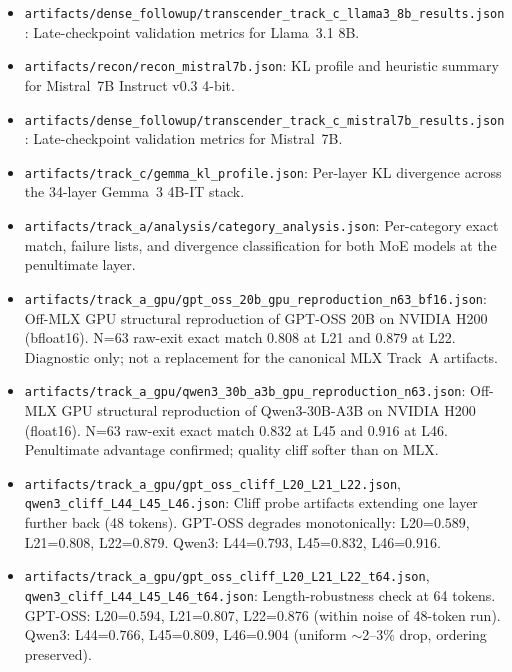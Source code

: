 \documentclass[11pt]{article}
\begin{document}
{\begin{itemize}
\item \texttt{artifacts/dense\_followup/transcender\_track\_c\_llama3\_8b\_results.json}:
  Late-checkpoint validation metrics for Llama~3.1 8B.

\item \texttt{artifacts/recon/recon\_mistral7b.json}:
  KL profile and heuristic summary for Mistral~7B Instruct v0.3 4-bit.

\item \texttt{artifacts/dense\_followup/transcender\_track\_c\_mistral7b\_results.json}:
  Late-checkpoint validation metrics for Mistral~7B.

\item \texttt{artifacts/track\_c/gemma\_kl\_profile.json}:
  Per-layer KL divergence across the 34-layer Gemma~3 4B-IT stack.

\item \texttt{artifacts/track\_a/analysis/category\_analysis.json}:
  Per-category exact match, failure lists, and divergence classification for both MoE models at the penultimate layer.

\item \texttt{artifacts/track\_a\_gpu/gpt\_oss\_20b\_gpu\_reproduction\_n63\_bf16.json}:
  Off-MLX GPU structural reproduction of GPT-OSS 20B on NVIDIA H200 (bfloat16). N=63 raw-exit exact match $0.808$ at L21 and $0.879$ at L22. Diagnostic only; not a replacement for the canonical MLX Track~A artifacts.

\item \texttt{artifacts/track\_a\_gpu/qwen3\_30b\_a3b\_gpu\_reproduction\_n63.json}:
  Off-MLX GPU structural reproduction of Qwen3-30B-A3B on NVIDIA H200 (float16). N=63 raw-exit exact match $0.832$ at L45 and $0.916$ at L46. Penultimate advantage confirmed; quality cliff softer than on MLX.

\item \texttt{artifacts/track\_a\_gpu/gpt\_oss\_cliff\_L20\_L21\_L22.json},
      \texttt{qwen3\_cliff\_L44\_L45\_L46.json}:
  Cliff probe artifacts extending one layer further back (48 tokens). GPT-OSS degrades monotonically: L20=$0.589$, L21=$0.808$, L22=$0.879$. Qwen3: L44=$0.793$, L45=$0.832$, L46=$0.916$.

\item \texttt{artifacts/track\_a\_gpu/gpt\_oss\_cliff\_L20\_L21\_L22\_t64.json},
      \texttt{qwen3\_cliff\_L44\_L45\_L46\_t64.json}:
  Length-robustness check at 64 tokens. GPT-OSS: L20=$0.594$, L21=$0.807$, L22=$0.876$ (within noise of 48-token run). Qwen3: L44=$0.766$, L45=$0.809$, L46=$0.904$ (uniform $\sim$2--3\% drop, ordering preserved).


\end{itemize}}
\end{document}
